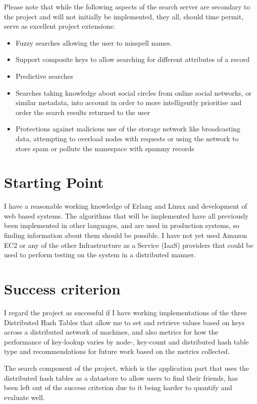 Please note that while the following aspects of the search server are secondary to the project and will not initially be implemented, they all, should time permit, serve as excellent project extensions:

\begin{itemize}
  \item Fuzzy searches allowing the user to misspell names.
  \item Support composite keys to allow searching for different attributes of a record
  \item Predictive searches
  \item Searches taking knowledge about social circles from online social networks, or similar metadata, into account in order to more intelligently prioritise and order the search results returned to the user
  \item Protections against malicious use of the storage network like broadcasting data, attempting to overload nodes with requests or using the network to store spam or pollute the namespace with spammy records
\end{itemize}


\section*{Starting Point}

I have a reasonable working knowledge of Erlang and Linux and development of web based systems. The algorithms that will be implemented have all previously been implemented in other languages, and are used in production systems, so finding information about them should be possible. I have not yet used Amazon EC2 or any of the other Infrastructure as a Service (IaaS) providers that could be used to perform testing on the system in a distributed manner.


\section*{Success criterion}

I regard the project as successful if I have working implementations of the three Distributed Hash Tables that allow me to set and retrieve values based on keys across a distributed network of machines, and also metrics for how the performance of key-lookup varies by node-, key-count and distributed hash table type and recommendations for future work based on the metrics collected.

The search component of the project, which is the application part that uses the distributed hash tables as a datastore to allow users to find their friends, has been left out of the success criterion due to it being harder to quantify and evaluate well.

